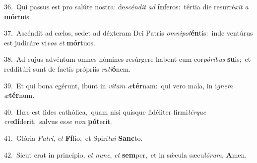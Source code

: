 {\numbfont\textcolor{\numbcolor}{36.}}~Qui passus est pro salúte nostra: de\-\textit{scén}\-\textit{dit} \textit{ad} \textbf{ín}\-feros:~\star tértia die resurré\textit{xit} \textit{a} \textbf{mór}\-tuis.\par
{\numbfont\textcolor{\numbcolor}{37.}}~Ascéndit ad cælos, sedet ad déxteram Dei Patris \textit{om}\-\textit{ni}\textit{pot}\textbf{én}tis:~\star inde ventúrus est judicáre vi\textit{vos} \textit{et} \textbf{mór}\-tuos.\par
{\numbfont\textcolor{\numbcolor}{38.}}~Ad cujus advéntum omnes hómines resúrgere habent cum cor\-\textit{pó}\-\textit{ri}\textit{bus} \textbf{su}\-is;~\star et redditúri sunt de factis própriis \textit{ra}\-\textit{ti}\textbf{ó}nem.\par
{\numbfont\textcolor{\numbcolor}{39.}}~Et qui bona egérunt, ibunt in \textit{vi}\-\textit{tam} \textit{æ}\-\textbf{tér}nam:~\star qui vero mala, in i\textit{gnem} \textit{æ}\-\textbf{tér}num.\par
{\numbfont\textcolor{\numbcolor}{40.}}~Hæc est fides cathólica,~\dagger quam nisi quisque fidéliter firmi\-\textit{tér}\-\textit{que} \textit{cre}\-\textbf{dí}derit,~\star salvus es\textit{se} \textit{non} \textbf{pót}\-erit.\par
{\numbfont\textcolor{\numbcolor}{41.}}~Glória \textit{Pa}\-\textit{tri}, \textit{et} \textbf{Fí}\-lio,~\star et Spirí\-\textit{tu}\-\textit{i} \textbf{Sanc}\-to.\par
{\numbfont\textcolor{\numbcolor}{42.}}~Sicut erat in princípio, \textit{et} \textit{nunc}\-, \textit{et} \textbf{sem}\-per,~\star et in sǽcula sæcu\-\textit{ló}\-\textit{rum}. \textbf{A}\-men.\par
